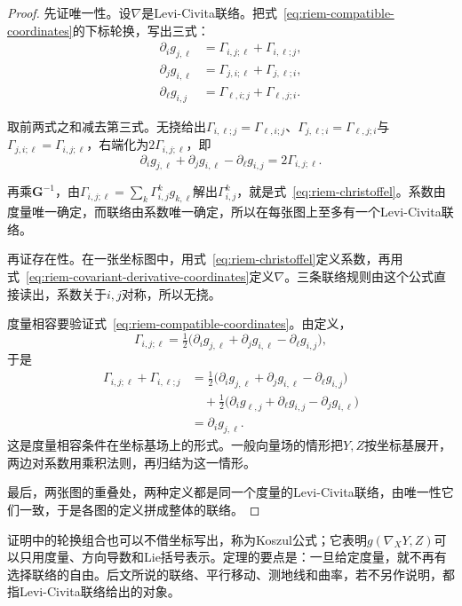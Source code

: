 \begin{proof}
先证唯一性。设$\nabla$是Levi-Civita联络。把式~\eqref{eq:riem-compatible-coordinates}的下标轮换，写出三式：
\[
\begin{aligned}
\partial_ig_{j,\ell}&=\Gamma_{i,j;\ell}+\Gamma_{i,\ell;j},\\
\partial_jg_{i,\ell}&=\Gamma_{j,i;\ell}+\Gamma_{j,\ell;i},\\
\partial_\ell g_{i,j}&=\Gamma_{\ell,i;j}+\Gamma_{\ell,j;i}.
\end{aligned}
\]

取前两式之和减去第三式。无挠给出$\Gamma_{i,\ell;j}=\Gamma_{\ell,i;j}$、$\Gamma_{j,\ell;i}=\Gamma_{\ell,j;i}$与$\Gamma_{j,i;\ell}=\Gamma_{i,j;\ell}$，右端化为$2\Gamma_{i,j;\ell}$，即
\[
\partial_ig_{j,\ell}+\partial_jg_{i,\ell}-\partial_\ell g_{i,j}=2\Gamma_{i,j;\ell}.
\]

再乘$\bm G^{-1}$，由$\Gamma_{i,j;\ell}=\sum_k\Gamma^k_{i,j}g_{k,\ell}$解出$\Gamma^k_{i,j}$，就是式~\eqref{eq:riem-christoffel}。系数由度量唯一确定，而联络由系数唯一确定，所以在每张图上至多有一个Levi-Civita联络。

再证存在性。在一张坐标图中，用式~\eqref{eq:riem-christoffel}定义系数，再用式~\eqref{eq:riem-covariant-derivative-coordinates}定义$\nabla$。三条联络规则由这个公式直接读出，系数关于$i,j$对称，所以无挠。

度量相容要验证式~\eqref{eq:riem-compatible-coordinates}。由定义，
\[
\Gamma_{i,j;\ell}=\tfrac12\bigl(\partial_ig_{j,\ell}+\partial_jg_{i,\ell}-\partial_\ell g_{i,j}\bigr),
\]
于是
\[
\begin{aligned}
\Gamma_{i,j;\ell}+\Gamma_{i,\ell;j}
&=\tfrac12\bigl(\partial_ig_{j,\ell}+\partial_jg_{i,\ell}-\partial_\ell g_{i,j}\bigr)\\
&\quad+\tfrac12\bigl(\partial_ig_{\ell,j}+\partial_\ell g_{i,j}-\partial_jg_{i,\ell}\bigr)\\
&=\partial_ig_{j,\ell}.
\end{aligned}
\]
这是度量相容条件在坐标基场上的形式。一般向量场的情形把$Y,Z$按坐标基展开，两边对系数用乘积法则，再归结为这一情形。

最后，两张图的重叠处，两种定义都是同一个度量的Levi-Civita联络，由唯一性它们一致，于是各图的定义拼成整体的联络。
\end{proof}

证明中的轮换组合也可以不借坐标写出，称为Koszul公式；它表明$g(\nabla_XY,Z)$可以只用度量、方向导数和Lie括号表示。定理的要点是：一旦给定度量，就不再有选择联络的自由。后文所说的联络、平行移动、测地线和曲率，若不另作说明，都指Levi-Civita联络给出的对象。

